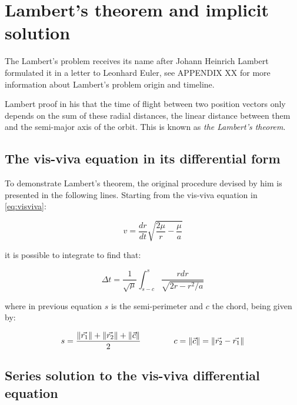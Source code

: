 \section{Lambert's theorem and implicit solution}
\label{sec:lamberts_theorem}

The Lambert's problem receives its name after Johann Heinrich Lambert formulated
it in a letter to Leonhard Euler, see APPENDIX XX for more information about
Lambert's problem origin and timeline.

Lambert proof in his  that the time of flight between two
position vectors only depends on the sum of these radial distances, the linear
distance between them and the semi-major axis of the orbit. This is known as
\textit{the Lambert's theorem}.

\subsection{The vis-viva equation in its differential form}

To demonstrate Lambert's theorem, the original procedure devised by him is
presented in the following lines. Starting from the vis-viva equation in
\ref{eq:visviva}:

\begin{equation}
  v = \frac{dr}{dt} \sqrt{\frac{2\mu}{r} - \frac{\mu}{a}}
  \label{eq:visviva}
\end{equation}

it is possible to integrate to find that:

\begin{equation}
  \Delta t = \frac{1}{\sqrt{\mu}} \int_{s-c}^{s} \frac{r dr}{\sqrt{2r -
      r^{2}/a}}
  \label{eq:visviva_integral}
\end{equation}

where in previous equation $s$ is the semi-perimeter and $c$ the chord, being
given by:

\begin{equation}
  s = \frac{\lVert\vec{r_{1}}\rVert + \lVert\vec{r_{2}}\rVert +
    \lVert\vec{c}\rVert}{2}\quad\quad\quad\quad
    c = \lVert\vec{c}\rVert = \lVert\vec{r_{2}} - \vec{r_{1}}\rVert
  \label{eq:s_and_c_lambert}
\end{equation}

\subsection{Series solution to the vis-viva differential equation}

